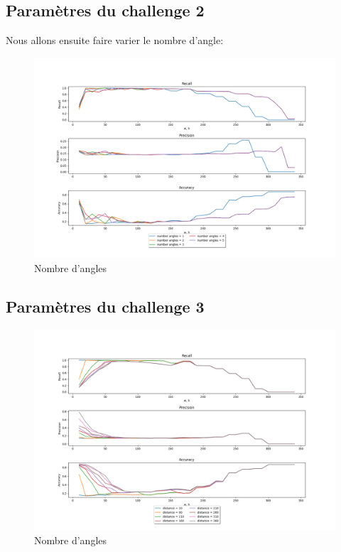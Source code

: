 \documentclass[a4paper,12pt, openany]{book}
\theoremstyle{break}
\begin{document}
\subsection{Paramètres du challenge 2}
Nous allons ensuite faire varier le nombre d'angle:

\begin{figure}[H]
  \includegraphics[width=\textwidth]{images/compare_angle}
  \caption{Nombre d'angles}
  \label{fig:angles}
\end{figure}


\subsection{Paramètres du challenge 3}

\begin{figure}[H]
  \includegraphics[width=\textwidth]{images/compare_distance}
  \caption{Nombre d'angles}
  \label{fig:dist}
\end{figure}
\end{document}
